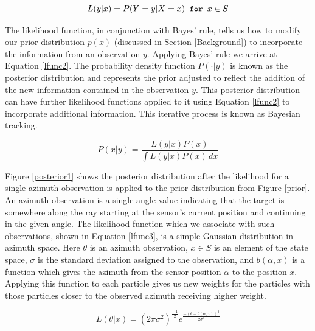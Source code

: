 \documentclass{article}
\begin{document}
\begin{equation}\label{lfunc1}
L(y|x) = P( Y=y | X=x ) \verb! for ! x \in S
\end{equation}

The likelihood function, in conjunction with Bayes' rule, tells us how to modify our prior distribution \(p(x)\) (discussed in Section \ref{Background}) to incorporate the information from an observation \(y\). Applying Bayes' rule we arrive at Equation \ref{lfunc2}. The probability density function \(P(\cdot|y)\) is known as the posterior distribution and represents the prior adjusted to reflect the addition of the new information contained in the observation \(y\). This posterior distribution can have further likelihood functions applied to it using Equation \ref{lfunc2} to incorporate additional information. This iterative process is known as Bayesian tracking.

\begin{equation}\label{lfunc2}
P(x|y) = \frac{L(y|x)P(x)}{\int \! L(y|x)P(x) \, dx}
\end{equation}

Figure \ref{posterior1} shows the posterior distribution after the likelihood for a single azimuth observation is applied to the prior distribution from Figure \ref{prior}. An azimuth observation is a single angle value indicating that the target is somewhere along the ray starting at the sensor's current position and continuing in the given angle. The likelihood function which we associate with such observations, shown in Equation \ref{lfunc3}, is a simple Gaussian distribution in azimuth space.\cite{bmtt} Here \(\theta\) is an azimuth observation, \(x \in S\) is an element of the state space, \(\sigma\) is the standard deviation assigned to the observation, and \(b(\alpha,x)\) is a function which gives the azimuth from the sensor position \(\alpha\) to the position \(x\). Applying this function to each particle gives us new weights for the particles with those particles closer to the observed azimuth receiving higher weight.

\begin{equation}\label{lfunc3}
L(\theta|x)=(2\pi\sigma^{2})^{\frac{-1}{2}}e^{\frac{-(\theta-b(\alpha,x))^{2}}{2\sigma^{2}}}
\end{equation}
\end{document}
